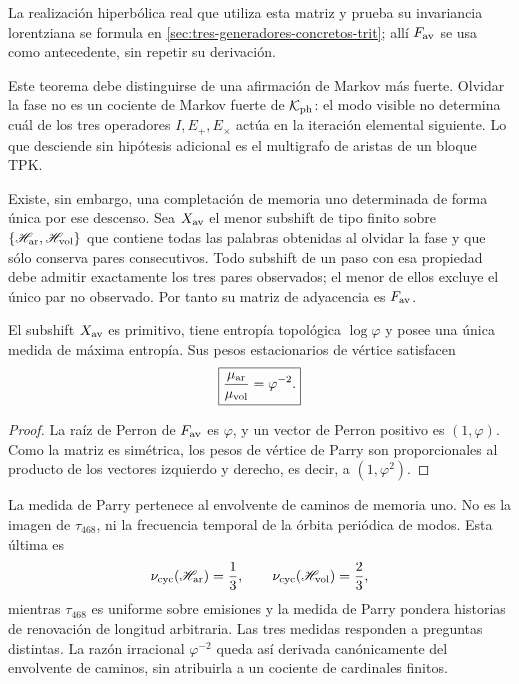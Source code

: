 La realización hiperbólica real que utiliza esta matriz y prueba su
invariancia lorentziana se formula en
\cref{sec:tres-generadores-concretos-trit}; allí \(F_{\rm av}\) se usa
como antecedente, sin repetir su derivación.

Este teorema debe distinguirse de una afirmación de Markov más fuerte.
Olvidar la fase no es un cociente de Markov fuerte de
\(\mathcal K_{\rm ph}\): el modo visible no determina cuál de los tres
operadores \(I,E_+,E_\times\) actúa en la iteración elemental siguiente. Lo que desciende
sin hipótesis adicional es el multigrafo de aristas de un bloque TPK\@.

Existe, sin embargo, una completación de memoria uno determinada de forma
única por ese descenso. Sea \(X_{\rm av}\) el menor subshift de tipo finito
sobre
\(\{\mathscr H_{\rm ar},\mathscr H_{\rm vol}\}\) que contiene todas las
palabras obtenidas al olvidar la fase y que sólo conserva pares consecutivos.
Todo subshift de un paso con esa propiedad debe admitir exactamente los tres
pares observados; el menor de ellos excluye el único par no observado. Por
tanto su matriz de adyacencia es \(F_{\rm av}\).

\begin{corollary}
\label{p12-83-c16-s2:cor:parry-envolvente-fav}
El subshift \(X_{\rm av}\) es primitivo, tiene entropía topológica
\(\log\varphi\) y posee una única medida de máxima entropía. Sus pesos
estacionarios de vértice satisfacen
\[
 \boxed{
 \frac{\mu_{\rm ar}}{\mu_{\rm vol}}=\varphi^{-2}.}
\]
\end{corollary}

\begin{proof}
La raíz de Perron de \(F_{\rm av}\) es \(\varphi\), y un vector de Perron
positivo es \((1,\varphi)\). Como la matriz es simétrica, los pesos de vértice
de Parry son proporcionales al producto de los vectores izquierdo y derecho,
es decir, a \((1,\varphi^2)\).
\end{proof}

La medida de Parry pertenece al envolvente de caminos de memoria uno. No es
la imagen de \(\tau_{468}\), ni la frecuencia temporal de la órbita periódica
de modos. Esta última es
\[
 \nu_{\rm cyc}(\mathscr H_{\rm ar})=\frac13,\qquad
 \nu_{\rm cyc}(\mathscr H_{\rm vol})=\frac23,
\]
mientras \(\tau_{468}\) es uniforme sobre emisiones y la medida de Parry
pondera historias de renovación de longitud arbitraria. Las tres medidas
responden a preguntas distintas. La razón irracional
\(\varphi^{-2}\) queda así derivada canónicamente del envolvente de caminos,
sin atribuirla a un cociente de cardinales finitos.

